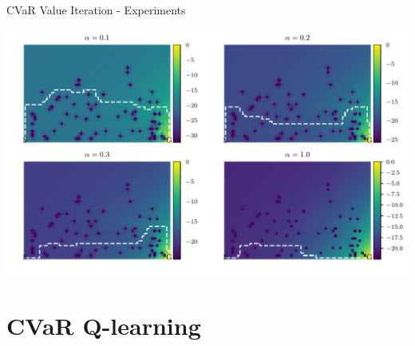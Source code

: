 \documentclass{beamer}
\begin{document}
\begin{frame}{CVaR Value Iteration - Experiments}

\center
\includegraphics[width=\linewidth]{../gfx/vi_optimal_paths.pdf}

\end{frame}

\section{CVaR Q-learning}

%
%
%


%
%
\end{document}
